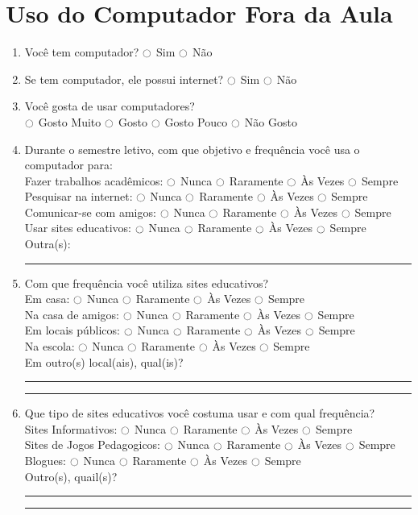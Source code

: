 \section{Uso do Computador Fora da Aula}
\begin{enumerate}
\item Você tem computador? $\ocircle$ Sim $\ocircle$ Não 
    
\item Se tem computador, ele possui internet? $\ocircle$ Sim $\ocircle$ Não
    
\item Você gosta de usar computadores? \\
$\ocircle$ Gosto Muito $\ocircle$ Gosto $\ocircle$ Gosto Pouco $\ocircle$ Não Gosto

\item Durante o semestre letivo, com que objetivo e frequência você usa o computador para: \\
Fazer trabalhos acadêmicos:  $\ocircle$ Nunca  $\ocircle$ Raramente  $\ocircle$ Às Vezes  $\ocircle$ Sempre \\
Pesquisar na internet: $\ocircle$ Nunca  $\ocircle$ Raramente  $\ocircle$ Às Vezes  $\ocircle$ Sempre \\
Comunicar-se com amigos: $\ocircle$ Nunca  $\ocircle$ Raramente  $\ocircle$ Às Vezes  $\ocircle$ Sempre \\
Usar sites educativos: $\ocircle$ Nunca  $\ocircle$ Raramente  $\ocircle$ Às Vezes  $\ocircle$ Sempre \\
Outra(s): \\
\noindent\rule{\textwidth}{0.4pt}

\item Com que frequência você utiliza sites educativos? \\
Em casa: $\ocircle$ Nunca  $\ocircle$ Raramente  $\ocircle$ Às Vezes  $\ocircle$ Sempre \\
Na casa de amigos: $\ocircle$ Nunca  $\ocircle$ Raramente  $\ocircle$ Às Vezes  $\ocircle$ Sempre \\
Em locais públicos: $\ocircle$ Nunca  $\ocircle$ Raramente  $\ocircle$ Às Vezes  $\ocircle$ Sempre \\
Na escola: $\ocircle$ Nunca  $\ocircle$ Raramente  $\ocircle$ Às Vezes  $\ocircle$ Sempre \\
Em outro(s) local(ais), qual(is)? \\
\noindent\rule{\textwidth}{0.4pt}
\noindent\rule{\textwidth}{0.4pt}


\item Que tipo de sites educativos você costuma usar e com qual frequência? \\
Sites Informativos: $\ocircle$ Nunca  $\ocircle$ Raramente  $\ocircle$ Às Vezes  $\ocircle$ Sempre \\
Sites de Jogos Pedagogicos: $\ocircle$ Nunca  $\ocircle$ Raramente  $\ocircle$ Às Vezes  $\ocircle$ Sempre \\
Blogues: $\ocircle$ Nunca  $\ocircle$ Raramente  $\ocircle$ Às Vezes  $\ocircle$ Sempre \\
Outro(s), quail(s)? \\
\noindent\rule{\textwidth}{0.4pt}
\noindent\rule{\textwidth}{0.4pt}


\end{enumerate}
